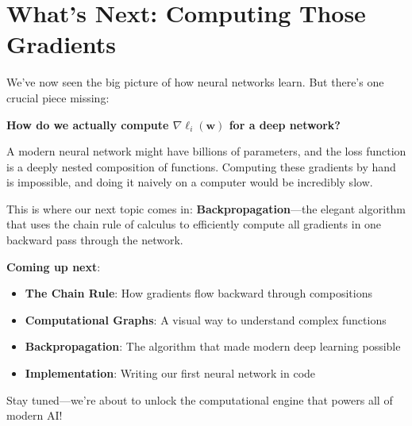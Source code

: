 \documentclass[11pt]{article}
\newcommand{\w}{\mathbf{w}}
\begin{document}
\newpage
\section{What's Next: Computing Those Gradients}

We've now seen the big picture of how neural networks learn. But there's one crucial piece missing:

\begin{center}
\Large\textbf{How do we actually compute $\nabla \ell_i(\w)$ for a deep network?}
\end{center}

A modern neural network might have billions of parameters, and the loss function is a deeply nested composition of functions. Computing these gradients by hand is impossible, and doing it naively on a computer would be incredibly slow.

This is where our next topic comes in: \textbf{Backpropagation}—the elegant algorithm that uses the chain rule of calculus to efficiently compute all gradients in one backward pass through the network.

\textbf{Coming up next}:
\begin{itemize}
\item \textbf{The Chain Rule}: How gradients flow backward through compositions
\item \textbf{Computational Graphs}: A visual way to understand complex functions
\item \textbf{Backpropagation}: The algorithm that made modern deep learning possible
\item \textbf{Implementation}: Writing our first neural network in code
\end{itemize}

Stay tuned—we're about to unlock the computational engine that powers all of modern AI!
\end{document}
